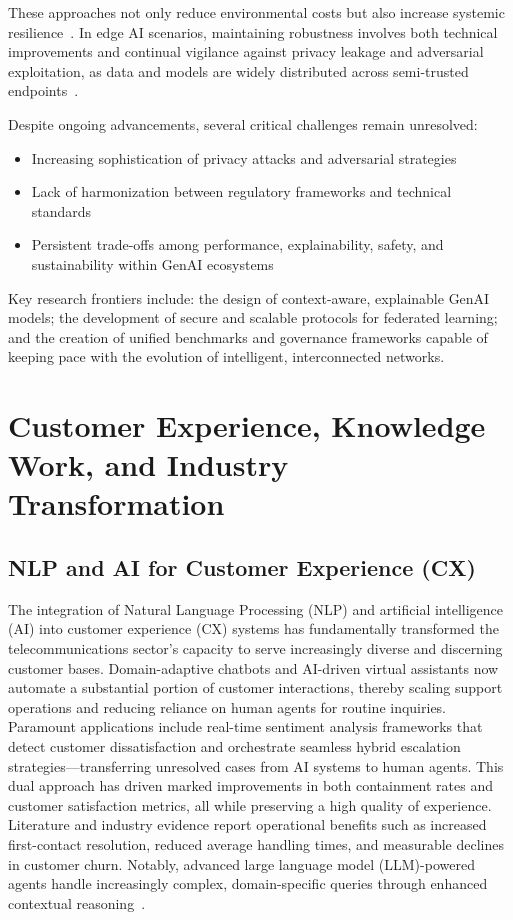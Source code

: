 These approaches not only reduce environmental costs but also increase systemic resilience~\cite{ref7,ref26}. In edge AI scenarios, maintaining robustness involves both technical improvements and continual vigilance against privacy leakage and adversarial exploitation, as data and models are widely distributed across semi-trusted endpoints~\cite{ref48,ref49}.

Despite ongoing advancements, several critical challenges remain unresolved:

\begin{itemize}
    \item Increasing sophistication of privacy attacks and adversarial strategies
    \item Lack of harmonization between regulatory frameworks and technical standards
    \item Persistent trade-offs among performance, explainability, safety, and sustainability within GenAI ecosystems
\end{itemize}

Key research frontiers include: the design of context-aware, explainable GenAI models; the development of secure and scalable protocols for federated learning; and the creation of unified benchmarks and governance frameworks capable of keeping pace with the evolution of intelligent, interconnected networks.

\section{Customer Experience, Knowledge Work, and Industry Transformation}

\subsection{NLP and AI for Customer Experience (CX)}

The integration of Natural Language Processing (NLP) and artificial intelligence (AI) into customer experience (CX) systems has fundamentally transformed the telecommunications sector’s capacity to serve increasingly diverse and discerning customer bases. Domain-adaptive chatbots and AI-driven virtual assistants now automate a substantial portion of customer interactions, thereby scaling support operations and reducing reliance on human agents for routine inquiries. Paramount applications include real-time sentiment analysis frameworks that detect customer dissatisfaction and orchestrate seamless hybrid escalation strategies—transferring unresolved cases from AI systems to human agents. This dual approach has driven marked improvements in both containment rates and customer satisfaction metrics, all while preserving a high quality of experience. Literature and industry evidence report operational benefits such as increased first-contact resolution, reduced average handling times, and measurable declines in customer churn. Notably, advanced large language model (LLM)-powered agents handle increasingly complex, domain-specific queries through enhanced contextual reasoning~\cite{ref18}.

